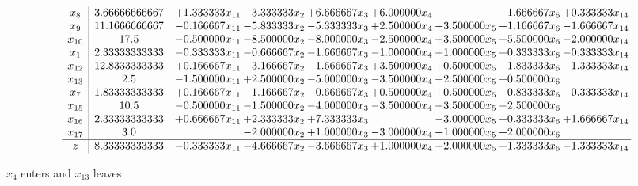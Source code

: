 \documentclass[10pt]{article}
\begin{document}
 \[\begin{array}{c| c c@{\hskip 2pt} c@{\hskip 2pt} c@{\hskip 2pt} c@{\hskip 2pt} c@{\hskip 2pt} c@{\hskip 2pt} c@{\hskip 2pt} }
 x_{8}   &  3.66666666667 & + 1.333333 x_{11} & -3.333333 x_{2} & + 6.666667 x_{3} & + 6.000000 x_{4} &   & + 1.666667 x_{6} & + 0.333333 x_{14}\\
 x_{9}   &  11.1666666667 & -0.166667 x_{11} & -5.833333 x_{2} & -5.333333 x_{3} & + 2.500000 x_{4} & + 3.500000 x_{5} & + 1.166667 x_{6} & -1.666667 x_{14}\\
 x_{10}   &  17.5 & -0.500000 x_{11} & -8.500000 x_{2} & -8.000000 x_{3} & -2.500000 x_{4} & + 3.500000 x_{5} & + 5.500000 x_{6} & -2.000000 x_{14}\\
 x_{1}   &  2.33333333333 & -0.333333 x_{11} & -0.666667 x_{2} & -1.666667 x_{3} & -1.000000 x_{4} & + 1.000000 x_{5} & + 0.333333 x_{6} & -0.333333 x_{14}\\
 x_{12}   &  12.8333333333 & + 0.166667 x_{11} & -3.166667 x_{2} & -1.666667 x_{3} & + 3.500000 x_{4} & + 0.500000 x_{5} & + 1.833333 x_{6} & -1.333333 x_{14}\\
 x_{13}   &  2.5 & -1.500000 x_{11} & + 2.500000 x_{2} & -5.000000 x_{3} & -3.500000 x_{4} & + 2.500000 x_{5} & + 0.500000 x_{6} &   \\
 x_{7}   &  1.83333333333 & + 0.166667 x_{11} & -1.166667 x_{2} & -0.666667 x_{3} & + 0.500000 x_{4} & + 0.500000 x_{5} & + 0.833333 x_{6} & -0.333333 x_{14}\\
 x_{15}   &  10.5 & -0.500000 x_{11} & -1.500000 x_{2} & -4.000000 x_{3} & -3.500000 x_{4} & + 3.500000 x_{5} & -2.500000 x_{6} &   \\
 x_{16}   &  2.33333333333 & + 0.666667 x_{11} & + 2.333333 x_{2} & + 7.333333 x_{3} &   & -3.000000 x_{5} & + 0.333333 x_{6} & + 1.666667 x_{14}\\
 x_{17}   &  3.0  &   & -2.000000 x_{2} & + 1.000000 x_{3} & -3.000000 x_{4} & + 1.000000 x_{5} & + 2.000000 x_{6} &   \\
\hline
z    &  8.33333333333 & -0.333333 x_{11} & -4.666667 x_{2} & -3.666667 x_{3} & + 1.000000 x_{4} & + 2.000000 x_{5} & + 1.333333 x_{6} & -1.333333 x_{14}\\
\end{array}\]


 $ x_{4} $ enters and $ x_{13} $ leaves 
\end{document}
